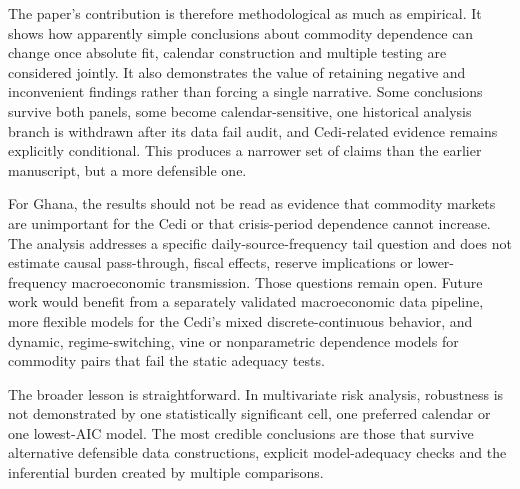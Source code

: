 The paper's contribution is therefore methodological as much as empirical. It shows how apparently simple conclusions about commodity dependence can change once absolute fit, calendar construction and multiple testing are considered jointly. It also demonstrates the value of retaining negative and inconvenient findings rather than forcing a single narrative. Some conclusions survive both panels, some become calendar-sensitive, one historical analysis branch is withdrawn after its data fail audit, and Cedi-related evidence remains explicitly conditional. This produces a narrower set of claims than the earlier manuscript, but a more defensible one.

For Ghana, the results should not be read as evidence that commodity markets are unimportant for the Cedi or that crisis-period dependence cannot increase. The analysis addresses a specific daily-source-frequency tail question and does not estimate causal pass-through, fiscal effects, reserve implications or lower-frequency macroeconomic transmission. Those questions remain open. Future work would benefit from a separately validated macroeconomic data pipeline, more flexible models for the Cedi's mixed discrete-continuous behavior, and dynamic, regime-switching, vine or nonparametric dependence models for commodity pairs that fail the static adequacy tests.

The broader lesson is straightforward. In multivariate risk analysis, robustness is not demonstrated by one statistically significant cell, one preferred calendar or one lowest-AIC model. The most credible conclusions are those that survive alternative defensible data constructions, explicit model-adequacy checks and the inferential burden created by multiple comparisons.
